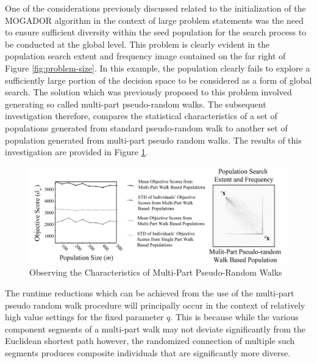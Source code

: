 One of the considerations previously discussed related to the initialization of the MOGADOR algorithm in the context of large problem statements was the need to ensure sufficient diversity within the seed population for the search process to be conducted at the global level. This problem is clearly evident in the population search extent and frequency image contained on the far right of Figure \ref{fig:problem-size}.  In this example, the population clearly fails to explore a sufficiently large portion of the decision space to be considered as a form of global search. The solution which was previously proposed to this problem involved generating so called multi-part pseudo-random walks. The subsequent investigation therefore, compares the statistical characteristics of a set of populations generated from standard pseudo-random walk to another set of population generated from multi-part pseudo random walks. The results of this investigation are provided in Figure \ref{fig:multi-part-walk-study}.
            
            \begin{figure}[Observing the Characteristics of Multi-Part Pseudo-Random Walks]
            \centering
            \includegraphics[width=5.5in]{figures/multi-part-walk-study.png}
            \caption[Observing the Characteristics of Multi-Part Pseudo-Random Walks]{Observing the Characteristics of Multi-Part Pseudo-Random Walks}
            \label{fig:multi-part-walk-study}
            \end{figure}
            
The runtime reductions which can be achieved from the use of the multi-part pseudo random walk procedure will principally occur in the context of relatively high value settings for the fixed parameter $q$. This is because while the various component segments of a multi-part walk may not deviate significantly from the Euclidean shortest path however, the randomized connection of multiple such segments produces composite individuals that are significantly more diverse.
            
